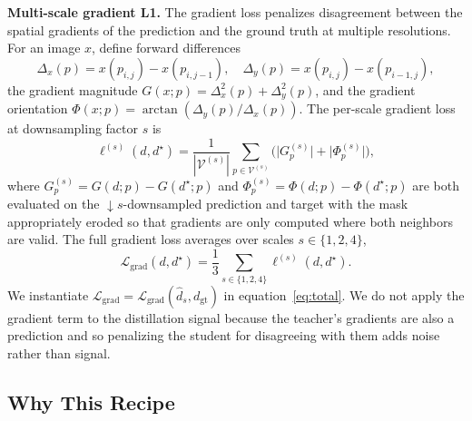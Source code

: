 \documentclass[10pt,twocolumn,letterpaper]{article}
\begin{document}
\textbf{Multi-scale gradient L1.} The gradient loss penalizes
disagreement between the spatial gradients of the prediction and the
ground truth at multiple resolutions. For an image $x$, define forward
differences
\begin{equation}
\Delta_x(p) = x(p_{i,j}) - x(p_{i,j-1}), \quad
\Delta_y(p) = x(p_{i,j}) - x(p_{i-1,j}),
\end{equation}
the gradient magnitude $G(x;p) = \Delta_x^2(p) + \Delta_y^2(p)$, and the
gradient orientation $\Phi(x;p) = \arctan(\Delta_y(p)/\Delta_x(p))$. The
per-scale gradient loss at downsampling factor $s$ is
\begin{equation}
\ell^{(s)}(d, d^{\star}) = \!\frac{1}{|\mathcal{V}^{(s)}|}\!\sum_{p\in\mathcal{V}^{(s)}}\!
\big(\big|G_p^{(s)}\big| + \big|\Phi_p^{(s)}\big|\big),
\end{equation}
where $G_p^{(s)} = G(d;p) - G(d^{\star};p)$ and
$\Phi_p^{(s)} = \Phi(d;p) - \Phi(d^{\star};p)$ are both evaluated on the
$\downarrow s$-downsampled prediction and target with the mask
appropriately eroded so that gradients are only computed where both
neighbors are valid. The full gradient loss averages over scales
$s\in\{1,2,4\}$,
\begin{equation}
\mathcal{L}_{\text{grad}}(d, d^{\star}) = \frac{1}{3}\sum_{s\in\{1,2,4\}} \ell^{(s)}(d, d^{\star}).
\end{equation}
We instantiate $\mathcal{L}_{\text{grad}} = \mathcal{L}_{\text{grad}}(\hat d_s, d_{\text{gt}})$
in equation~\eqref{eq:total}. We do not apply the gradient term to the
distillation signal because the teacher's gradients are also a
prediction and so penalizing the student for disagreeing with them adds
noise rather than signal.

\subsection{Why This Recipe}
\label{sec:novelty}
\end{document}
